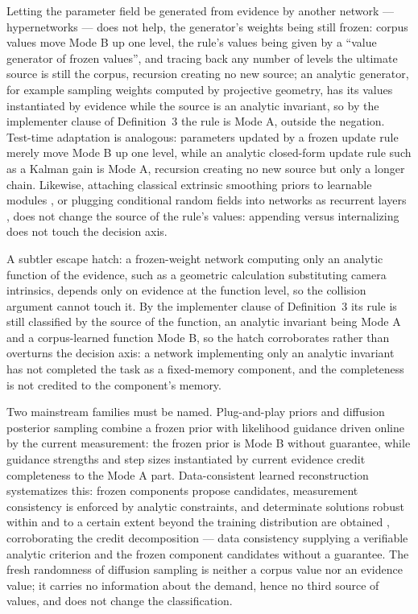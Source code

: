 Letting the parameter field be generated from evidence by another network --- hypernetworks \citep{ha2016} --- does not help, the generator's weights being still frozen: corpus values move Mode B up one level, the rule's values being given by a ``value generator of frozen values'', and tracing back any number of levels the ultimate source is still the corpus, recursion creating no new source; an analytic generator, for example sampling weights computed by projective geometry, has its values instantiated by evidence while the source is an analytic invariant, so by the implementer clause of Definition~3 the rule is Mode A, outside the negation. Test-time adaptation is analogous: parameters updated by a frozen update rule merely move Mode B up one level, while an analytic closed-form update rule such as a Kalman gain is Mode A, recursion creating no new source but only a longer chain. Likewise, attaching classical extrinsic smoothing priors to learnable modules \citep{lan2023}, or plugging conditional random fields into networks as recurrent layers \citep{zheng2015}, does not change the source of the rule's values: appending versus internalizing does not touch the decision axis.

A subtler escape hatch: a frozen-weight network computing only an analytic function of the evidence, such as a geometric calculation substituting camera intrinsics, depends only on evidence at the function level, so the collision argument cannot touch it. By the implementer clause of Definition~3 its rule is still classified by the source of the function, an analytic invariant being Mode A and a corpus-learned function Mode B, so the hatch corroborates rather than overturns the decision axis: a network implementing only an analytic invariant has not completed the task as a fixed-memory component, and the completeness is not credited to the component's memory.

Two mainstream families must be named. Plug-and-play priors \citep{venkatakrishnan2013} and diffusion posterior sampling \citep{chung2023} combine a frozen prior with likelihood guidance driven online by the current measurement: the frozen prior is Mode B without guarantee, while guidance strengths and step sizes instantiated by current evidence credit completeness to the Mode A part. Data-consistent learned reconstruction systematizes this: frozen components propose candidates, measurement consistency is enforced by analytic constraints, and determinate solutions robust within and to a certain extent beyond the training distribution are obtained \citep{haltmeier2026}, corroborating the credit decomposition --- data consistency supplying a verifiable analytic criterion and the frozen component candidates without a guarantee. The fresh randomness of diffusion sampling is neither a corpus value nor an evidence value; it carries no information about the demand, hence no third source of values, and does not change the classification.

